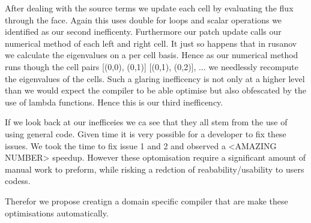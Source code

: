 After dealing with the source terms we update each cell by evaluating the flux through the face.
Again this uses double for loops and scalar operations we identified as our second inefficenty.
Furthermore our patch update calls our numerical method of each left and right cell.
It just so happens that in rusanov we calculate the eigenvalues on a per cell basis.
Hence as our numerical method runs though the cell pairs [(0,0), (0,1)] [(0,1), (0,2)], ... we needlessly recompute the eigenvalues of the cells.
Such a glaring inefficency is not only at a higher level than we would expect the compiler to be able optimise but also obfescated by the use of lambda functions.
Hence this is our third inefficency.


If we look back at our inefficeies we ca see that they all stem from the use of using general code.
Given time it is very possible for a developer to fix these issues.
We took the time to fix issue 1 and 2 and observed a <AMAZING NUMBER> speedup.
However these optomisation require a significant amount of manual work to preform, while risking a redction of reabability/usability to users codess.

Therefor we propose creatign a domain specific compiler that are make these optimisations automatically.



